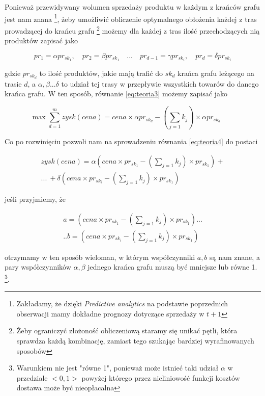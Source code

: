 \documentclass{article}
\begin{document}
Ponieważ przewidywany wolumen sprzedaży produktu w każdym z krańców grafu jest nam znana  \footnote{Zakładamy, że dzięki \textit{Predictive analytics} na podstawie poprzednich obserwacji mamy dokładne prognozy dotyczące sprzedaży w $t+1$}, żeby umożliwić obliczenie optymalnego obłożenia każdej z tras prowadzącej do krańcu grafu \footnote{Żeby ograniczyć złożoność obliczeniową staramy się unikać pętli, która sprawdza każdą kombinację, zamiast tego szukając bardziej wyrafinowanych sposobów} możemy dla każdej z tras ilość przechodzących nią produktów zapisać jako 

\begin{equation*}
pr_1 = \alpha pr_{sk_1} , \quad pr_2 = \beta pr_{sk_1} \quad ... \quad  pr_{d-1} = \gamma pr_{sk_i} ,\quad  pr_d = \delta  pr_{sk_i}
\end{equation*}



gdzie $pr_{sk_d}$ to ilość produktów, jakie mają trafić do $sk_d$ krańca grafu leżącego na trasie $d$, a $\alpha,\beta...\delta$ to udział tej trasy w przepływie wszystkich towarów do danego krańca grafu. W ten sposób, równanie  \ref{eq:teoria3} możemy zapisać jako 

\begin{equation} \label{eq:teoria4}
\max \sum\limits_{d=1}^m  zysk(cena) = 
cena \times \alpha pr_{sk_d}-  ( \sum\limits_{j=1} k_j) \times \alpha pr_{sk_d} \qquad 
\end{equation}

Co po rozwinięciu pozwoli nam na sprowadzeniu równania \ref{eq:teoria4} do postaci

\begin{multline} \label{eq:teoria5}
zysk(cena) = \alpha(cena \times pr_{sk_1} - ( \sum\limits_{j=1} k_j) \times pr_{sk_1}) + \\
 ... \ + \delta(cena \times pr_{sk_i} - ( \sum\limits_{j=1} k_j) \times pr_{sk_1})
\end{multline}


jeśli przyjmiemy, że  

\begin{multline*}
a = (cena \times pr_{sk_1} - ( \sum\limits_{j=1} k_j) \times pr_{sk_1}) ... \\
.. b=(cena \times pr_{sk_i} - ( \sum\limits_{j=1} k_j) \times pr_{sk_1})
\end{multline*}

otrzymamy w ten sposób wieloman, w którym współczynniki $a,b$ są nam znane, a pary współczynników $\alpha, \beta$ jednego krańca grafu muszą być mniejsze lub równe 1. \footnote{Warunkiem nie jest "równe 1", ponieważ może istnieć taki udział $\alpha$ w przedziale $<0,1>$ powyżej którego przez nieliniowość funkcji kosztów dostawa może być nieopłacalna}. 
\end{document}
